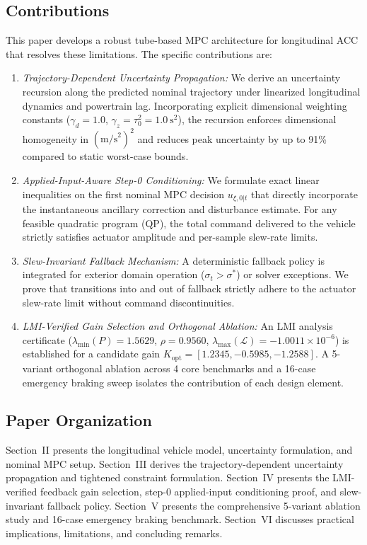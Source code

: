 \documentclass[journal]{IEEEtran}
\begin{document}
\subsection{Contributions}

This paper develops a robust tube-based MPC architecture for longitudinal ACC that resolves these limitations. The specific contributions are:
\begin{enumerate}
    \item \emph{Trajectory-Dependent Uncertainty Propagation:} We derive an uncertainty recursion along the predicted nominal trajectory under linearized longitudinal dynamics and powertrain lag. Incorporating explicit dimensional weighting constants ($\gamma_d = 1.0$, $\gamma_z = \tau_0^2 = 1.0~\text{s}^2$), the recursion enforces dimensional homogeneity in $(\text{m/s}^2)^2$ and reduces peak uncertainty by up to 91\% compared to static worst-case bounds.
    \item \emph{Applied-Input-Aware Step-0 Conditioning:} We formulate exact linear inequalities on the first nominal MPC decision $u_{\xi,0|t}$ that directly incorporate the instantaneous ancillary correction and disturbance estimate. For any feasible quadratic program (QP), the total command delivered to the vehicle strictly satisfies actuator amplitude and per-sample slew-rate limits.
    \item \emph{Slew-Invariant Fallback Mechanism:} A deterministic fallback policy is integrated for exterior domain operation ($\sigma_t > \sigma^*$) or solver exceptions. We prove that transitions into and out of fallback strictly adhere to the actuator slew-rate limit without command discontinuities.
    \item \emph{LMI-Verified Gain Selection and Orthogonal Ablation:} An LMI analysis certificate ($\lambda_{\min}(P) = 1.5629$, $\rho = 0.9560$, $\lambda_{\max}(\mathcal{L}) = -1.0011\times 10^{-6}$) is established for a candidate gain $K_{\mathrm{opt}} = [1.2345, -0.5985, -1.2588]$. A 5-variant orthogonal ablation across 4 core benchmarks and a 16-case emergency braking sweep isolates the contribution of each design element.
\end{enumerate}

\subsection{Paper Organization}

Section~II presents the longitudinal vehicle model, uncertainty formulation, and nominal MPC setup. Section~III derives the trajectory-dependent uncertainty propagation and tightened constraint formulation. Section~IV presents the LMI-verified feedback gain selection, step-0 applied-input conditioning proof, and slew-invariant fallback policy. Section~V presents the comprehensive 5-variant ablation study and 16-case emergency braking benchmark. Section~VI discusses practical implications, limitations, and concluding remarks.
\end{document}
